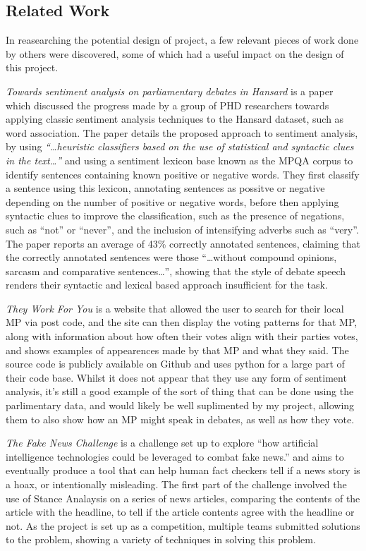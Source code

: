 \subsection{Related Work}
\label{sec:bck_related}
In reasearching the potential design of project, a few relevant pieces of work done by others were discovered, some of which had a useful impact on the design of this project. 

\emph{Towards sentiment analysis on parliamentary debates in Hansard}\cite{Onyimadu2014} is a paper which discussed the progress made by a group of PHD researchers towards applying classic sentiment analysis techniques to the Hansard dataset, such as word association. The paper details the proposed approach to sentiment analysis, by using \emph{“…heuristic classifiers based on the use of statistical and syntactic clues in the text…”} and using a sentiment lexicon base known as the MPQA corpus to identify sentences containing known positive or negative words. They first classify a sentence using this lexicon, annotating sentences as possitve or negative depending on the number of positive or negative words, before then applying syntactic clues to improve the classification, such as the presence of negations, such as “not” or “never”, and the inclusion of intensifying adverbs such as “very”. The paper reports an average of 43\% correctly annotated sentences, claiming that the correctly annotated sentences were those “…without compound opinions, sarcasm and comparative sentences…”, showing that the style of debate speech renders their syntactic and lexical based approach insufficient for the task.

\emph{They Work For You}\cite{mySociety} is a website that allowed the user to search for their local MP via post code, and the site can then display the voting patterns for that MP, along with information about how often their votes align with their parties votes, and shows examples of appearences made by that MP and what they said. The source code is publicly available on Github and uses python for a large part of their code base. Whilst it does not appear that they use any form of sentiment analysis, it’s still a good example of the sort of thing that can be done using the parlimentary data, and would likely be well suplimented by my project, allowing them to also show how an MP might speak in debates, as well as how they vote.

\emph{The Fake News Challenge}\cite{FakeNewsChallenge2017} is a challenge set up to explore “how artificial intelligence technologies could be leveraged to combat fake news.” and aims to eventually produce a tool that can help human fact checkers tell if a news story is a hoax, or intentionally misleading. The first part of the challenge involved the use of Stance Analaysis on a series of news articles, comparing the contents of the article with the headline, to tell if the article contents agree with the headline or not. As the project is set up as a competition, multiple teams submitted solutions to the problem, showing a variety of techniques in solving this problem. 
